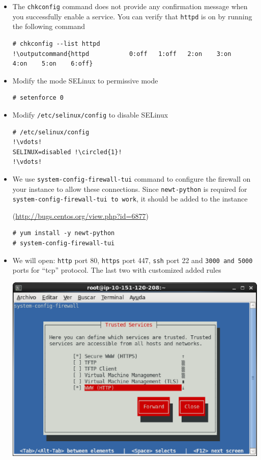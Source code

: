\documentclass{beamer}
\newcommand*\circled[1]{\tikz[baseline=(char.base)]{
            \node[shape=circle,draw,inner sep=2pt] (char) {#1};}}
\newcommand{\outputcommand}[1]{\color{darkgreen}{#1}}
\begin{document}
\begin{frame}
\begin{itemize}
\item The \texttt{chkconfig} command does not provide any confirmation message when you successfully enable a service. You can verify that \texttt{httpd} is on by running the following command

\lstset{language=shell}
\begin{lstlisting}[escapechar=!]
# chkconfig --list httpd
!\outputcommand{httpd           0:off   1:off   2:on    3:on    4:on    5:on    6:off}
\end{lstlisting}

\item Modify the mode SELinux to permissive mode
\lstset{language=shell}
\begin{lstlisting}[escapechar=!]
# setenforce 0
\end{lstlisting}

\item Modify \texttt{/etc/selinux/config} to disable SELinux

\lstset{language=shell}
\begin{lstlisting}[escapechar=!]
# /etc/selinux/config
!\vdots!
SELINUX=disabled !\circled{1}!
!\vdots!
\end{lstlisting}

\item We use \texttt{system-config-firewall-tui} command to configure the firewall on your instance to allow these connections. 
Since \texttt{newt-python} is required for \texttt{system-config-firewall-tui to work}, it should be added to the instance

(\href{http://bugs.centos.org/view.php?id=6877}{http://bugs.centos.org/view.php?id=6877})
\lstset{language=shell}
\begin{lstlisting}[escapechar=!]
# yum install -y newt-python 
# system-config-firewall-tui
\end{lstlisting}

\item We will open: \texttt{http} port 80, \texttt{https} port 447,  \texttt{ssh} port 22 
and \texttt{\alert{3000 and 5000}} ports for ``tcp'' protocol. The last two with customized added rules
 
\includegraphics[width=0.5 \textwidth]{system-config-firewall-tui.eps}


\end{itemize}
\end{frame}
\end{document}
